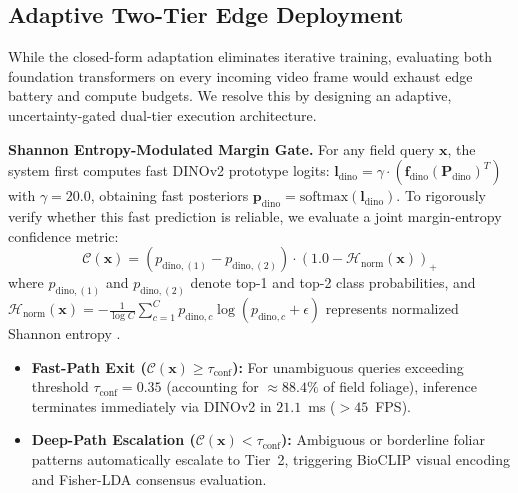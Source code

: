 \documentclass[conference]{IEEEtran}
\begin{document}
\subsection{Adaptive Two-Tier Edge Deployment}
\label{sec:edge_deployment}
While the closed-form adaptation eliminates iterative training, evaluating both foundation transformers on every incoming video frame would exhaust edge battery and compute budgets. We resolve this by designing an adaptive, uncertainty-gated dual-tier execution architecture.

\textbf{Shannon Entropy-Modulated Margin Gate.} For any field query $\mathbf{x}$, the system first computes fast DINOv2 prototype logits: $\mathbf{l}_{\text{dino}} = \gamma \cdot (\mathbf{f}_{\text{dino}} (\mathbf{P}_{\text{dino}})^T)$ with $\gamma = 20.0$, obtaining fast posteriors $\mathbf{p}_{\text{dino}} = \text{softmax}(\mathbf{l}_{\text{dino}})$. To rigorously verify whether this fast prediction is reliable, we evaluate a joint margin-entropy confidence metric:
\begin{equation}
    \mathcal{C}(\mathbf{x}) = \left(p_{\text{dino}, (1)} - p_{\text{dino}, (2)}\right) \cdot \left(1.0 - \mathcal{H}_{\text{norm}}(\mathbf{x})\right)_+
\end{equation}
where $p_{\text{dino}, (1)}$ and $p_{\text{dino}, (2)}$ denote top-1 and top-2 class probabilities, and $\mathcal{H}_{\text{norm}}(\mathbf{x}) = -\frac{1}{\log C} \sum_{c=1}^C p_{\text{dino}, c} \log(p_{\text{dino}, c} + \epsilon)$ represents normalized Shannon entropy \cite{shannon1948mathematical}.
\begin{itemize}
    \item \textbf{Fast-Path Exit ($\mathcal{C}(\mathbf{x}) \ge \tau_{\text{conf}}$):} For unambiguous queries exceeding threshold $\tau_{\text{conf}} = 0.35$ (accounting for $\approx 88.4\%$ of field foliage), inference terminates immediately via DINOv2 in $21.1$~ms ($>45$~FPS).
    \item \textbf{Deep-Path Escalation ($\mathcal{C}(\mathbf{x}) < \tau_{\text{conf}}$):} Ambiguous or borderline foliar patterns automatically escalate to Tier~2, triggering BioCLIP visual encoding and Fisher-LDA consensus evaluation.
\end{itemize}
\end{document}

